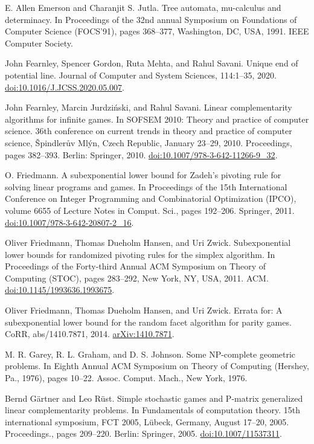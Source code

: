  E. Allen Emerson and Charanjit S. Jutla. Tree automata, mu-calculus and determinacy. In Proceedings of the 32nd annual Symposium on Foundations of Computer Science (FOCS’91), pages 368–377, Washington, DC, USA, 1991. IEEE Computer Society.

 John Fearnley, Spencer Gordon, Ruta Mehta, and Rahul Savani. Unique end of potential line. Journal of Computer and System Sciences, 114:1–35, 2020. \href{https://doi.org/10.1016/J.JCSS.2020.05.007}{doi:10.1016/J.JCSS.2020.05.007}.

 John Fearnley, Marcin Jurdziński, and Rahul Savani. Linear complementarity algorithms for infinite games. In SOFSEM 2010: Theory and practice of computer science. 36th conference on current trends in theory and practice of computer science, Špindlerův Mlýn, Czech Republic, January 23–29, 2010. Proceedings, pages 382–393. Berlin: Springer, 2010. \href{https://doi.org/10.1007/978-3-642-11266-9_32}{doi:10.1007/978-3-642-11266-9\_32}.

 O. Friedmann. A subexponential lower bound for Zadeh’s pivoting rule for solving linear programs and games. In Proceedings of the 15th International Conference on Integer Programming and Combinatorial Optimization (IPCO), volume 6655 of Lecture Notes in Comput. Sci., pages 192–206. Springer, 2011. \href{https://doi.org/10.1007/978-3-642-20807-2_16}{doi:10.1007/978-3-642-20807-2\_16}.

 Oliver Friedmann, Thomas Dueholm Hansen, and Uri Zwick. Subexponential lower bounds for randomized pivoting rules for the simplex algorithm. In Proceedings of the Forty-third Annual ACM Symposium on Theory of Computing (STOC), pages 283–292, New York, NY, USA, 2011. ACM. \href{https://doi.org/10.1145/1993636.1993675}{doi:10.1145/1993636.1993675}.

 Oliver Friedmann, Thomas Dueholm Hansen, and Uri Zwick. Errata for: A subexponential lower bound for the random facet algorithm for parity games. CoRR, abs/1410.7871, 2014. \href{https://arxiv.org/abs/1410.7871}{arXiv:1410.7871}.

 M. R. Garey, R. L. Graham, and D. S. Johnson. Some NP-complete geometric problems. In Eighth Annual ACM Symposium on Theory of Computing (Hershey, Pa., 1976), pages 10–22. Assoc. Comput. Mach., New York, 1976.

 Bernd Gärtner and Leo Rüst. Simple stochastic games and P-matrix generalized linear complementarity problems. In Fundamentals of computation theory. 15th international symposium, FCT 2005, Lübeck, Germany, August 17–20, 2005. Proceedings., pages 209–220. Berlin: Springer, 2005. \href{https://doi.org/10.1007/11537311}{doi:10.1007/11537311}.

